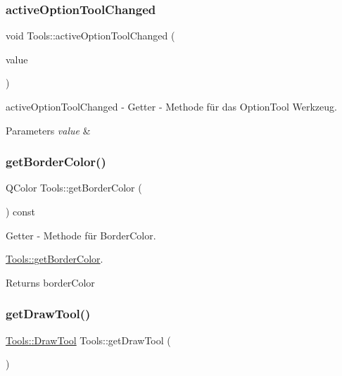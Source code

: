 \subsubsection{\texorpdfstring{active\+Option\+Tool\+Changed}{activeOptionToolChanged}}
{\footnotesize\ttfamily void Tools\+::active\+Option\+Tool\+Changed (\begin{DoxyParamCaption}\item[{const \hyperlink{class_tools_a4b55b2ca4eef4d80ae1042233832bb8b}{Tools\+::\+Option\+Tool} \&}]{value }\end{DoxyParamCaption})\hspace{0.3cm}{\ttfamily [signal]}}



active\+Option\+Tool\+Changed -\/ Getter -\/ Methode für das Option\+Tool Werkzeug. 


\begin{DoxyParams}{Parameters}
{\em value} & \\
\hline
\end{DoxyParams}
\mbox{\label{class_tools_a263df3826bfd5975d1e379060ea554dc}} 
\subsubsection{\texorpdfstring{get\+Border\+Color()}{getBorderColor()}}
{\footnotesize\ttfamily Q\+Color Tools\+::get\+Border\+Color (\begin{DoxyParamCaption}{ }\end{DoxyParamCaption}) const}



Getter -\/ Methode für Border\+Color. 

\hyperlink{class_tools_a263df3826bfd5975d1e379060ea554dc}{Tools\+::get\+Border\+Color}.

\begin{DoxyReturn}{Returns}
border\+Color 
\end{DoxyReturn}
\mbox{\label{class_tools_a4e8bdc1c74c1d9b5969c6b8afef0f805}} 
\subsubsection{\texorpdfstring{get\+Draw\+Tool()}{getDrawTool()}}
{\footnotesize\ttfamily \hyperlink{class_tools_ab031688a77e89a80ce8b5db7014684a3}{Tools\+::\+Draw\+Tool} Tools\+::get\+Draw\+Tool (\begin{DoxyParamCaption}{ }\end{DoxyParamCaption})}



